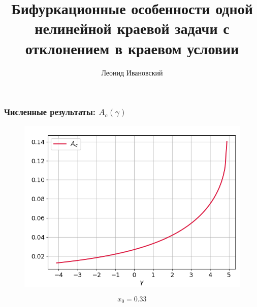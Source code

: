 \documentclass[fullscreen=true, unicode, bookmarks=false]{beamer}
\begin{document}
\begin{frame}
\frametitle{ Численные результаты: $ A_c(\gamma) $ }

\begin{figure} 
\includegraphics[scale=0.55]{oscillating_amplitude_13.png}  
\end{figure}

$$ x_0 = 0.33 $$

\end{frame}

\title[]{ {\huge Бифуркационные особенности одной нелинейной краевой задачи с отклонением в краевом условии} }   
\author[]{{\Large Леонид Ивановский}} 
\date{ }

\begin{frame}
\titlepage
\end{frame} 
\end{document}
